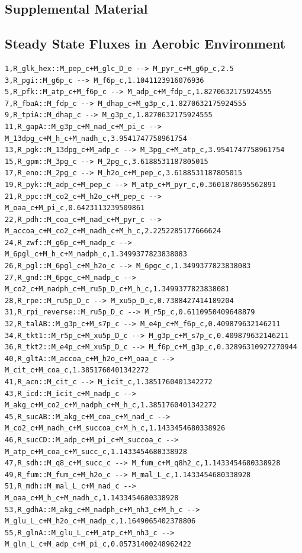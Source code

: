 \documentclass{article}
\begin{document}
\begin{landscape}
\section*{Supplemental Material}
\subsection*{Steady State Fluxes in Aerobic Environment}

\begin{verbatim}
1,R_glk_hex::M_pep_c+M_glc_D_e --> M_pyr_c+M_g6p_c,2.5
3,R_pgi::M_g6p_c --> M_f6p_c,1.1041123916076936
5,R_pfk::M_atp_c+M_f6p_c --> M_adp_c+M_fdp_c,1.8270632175924555
7,R_fbaA::M_fdp_c --> M_dhap_c+M_g3p_c,1.8270632175924555
9,R_tpiA::M_dhap_c --> M_g3p_c,1.8270632175924555
11,R_gapA::M_g3p_c+M_nad_c+M_pi_c --> M_13dpg_c+M_h_c+M_nadh_c,3.9541747758961754
13,R_pgk::M_13dpg_c+M_adp_c --> M_3pg_c+M_atp_c,3.9541747758961754
15,R_gpm::M_3pg_c --> M_2pg_c,3.6188531187805015
17,R_eno::M_2pg_c --> M_h2o_c+M_pep_c,3.6188531187805015
19,R_pyk::M_adp_c+M_pep_c --> M_atp_c+M_pyr_c,0.3601878695562891
21,R_ppc::M_co2_c+M_h2o_c+M_pep_c --> M_oaa_c+M_pi_c,0.6423113239509861
22,R_pdh::M_coa_c+M_nad_c+M_pyr_c --> M_accoa_c+M_co2_c+M_nadh_c+M_h_c,2.2252285177666624
24,R_zwf::M_g6p_c+M_nadp_c --> M_6pgl_c+M_h_c+M_nadph_c,1.3499377823838083
26,R_pgl::M_6pgl_c+M_h2o_c --> M_6pgc_c,1.3499377823838083
27,R_gnd::M_6pgc_c+M_nadp_c --> M_co2_c+M_nadph_c+M_ru5p_D_c+M_h_c,1.3499377823838081
28,R_rpe::M_ru5p_D_c --> M_xu5p_D_c,0.7388427414189204
31,R_rpi_reverse::M_ru5p_D_c --> M_r5p_c,0.6110950409648879
32,R_talAB::M_g3p_c+M_s7p_c --> M_e4p_c+M_f6p_c,0.409879632146211
34,R_tkt1::M_r5p_c+M_xu5p_D_c --> M_g3p_c+M_s7p_c,0.409879632146211
36,R_tkt2::M_e4p_c+M_xu5p_D_c --> M_f6p_c+M_g3p_c,0.32896310927270944
40,R_gltA::M_accoa_c+M_h2o_c+M_oaa_c --> M_cit_c+M_coa_c,1.3851760401342272
41,R_acn::M_cit_c --> M_icit_c,1.3851760401342272
43,R_icd::M_icit_c+M_nadp_c --> M_akg_c+M_co2_c+M_nadph_c+M_h_c,1.3851760401342272
45,R_sucAB::M_akg_c+M_coa_c+M_nad_c --> M_co2_c+M_nadh_c+M_succoa_c+M_h_c,1.1433454680338926
46,R_sucCD::M_adp_c+M_pi_c+M_succoa_c --> M_atp_c+M_coa_c+M_succ_c,1.1433454680338928
47,R_sdh::M_q8_c+M_succ_c --> M_fum_c+M_q8h2_c,1.1433454680338928
49,R_fum::M_fum_c+M_h2o_c --> M_mal_L_c,1.1433454680338928
51,R_mdh::M_mal_L_c+M_nad_c --> M_oaa_c+M_h_c+M_nadh_c,1.1433454680338928
53,R_gdhA::M_akg_c+M_nadph_c+M_nh3_c+M_h_c --> M_glu_L_c+M_h2o_c+M_nadp_c,1.1649065402378806
55,R_glnA::M_glu_L_c+M_atp_c+M_nh3_c --> M_gln_L_c+M_adp_c+M_pi_c,0.05731400248962422

\end{verbatim}
\end{landscape}
\end{document}
